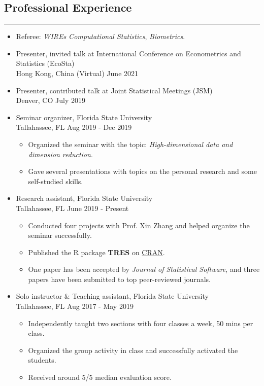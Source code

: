 \documentclass[10pt, oneside]{article}
\begin{document}
\subsection*{Professional Experience}
\noindent\rule{\textwidth}{1pt}
\begin{itemize}[itemsep=-1pt]
    \item Referee: \textit{WIREs Computational Statistics}, \textit{Biometrics}.
    \item Presenter, invited talk at International Conference on Econometrics and Statistics (EcoSta)\\
    Hong Kong, China (Virtual) \hfill June 2021
    \item Presenter, contributed talk at Joint Statistical Meetings (JSM)\\
    Denver, CO \hfill July 2019

    \item Seminar organizer, Florida State University \\
    Tallahassee, FL \hfill Aug 2019 - Dec 2019
    \begin{itemize}[topsep=-2pt,itemsep=-1pt]
        \item Organized the seminar with the topic: \textit{High-dimensional data and dimension reduction}.
        \item Gave several presentations with topics on the personal research and some self-studied skills.
    \end{itemize}

    \item Research assistant, Florida State University\\
    Tallahassee, FL \hfill June 2019 - Present
    \begin{itemize}[topsep=-2pt,itemsep=-1pt]
        \item Conducted four projects with Prof. Xin Zhang and helped organize the seminar successfully.
        \item Published the R package \textbf{TRES} on \href{https://CRAN.R-project.org/package=TRES}{CRAN}.
        \item One paper has been accepted by \textit{Journal of Statistical Software}, and three papers have been submitted to top peer-reviewed journals.
    \end{itemize}

    \item Solo instructor \& Teaching assistant, Florida State University\\
    Tallahassee, FL \hfill Aug 2017 - May 2019
    \begin{itemize}[topsep=-2pt,itemsep=-1pt]
        \item Independently taught two sections with four classes a week, 50 mins per class.
        \item Organized the group activity in class and successfully activated the students.
        \item Received around 5/5 median evaluation score.
    \end{itemize}


\end{itemize}
\end{document}
